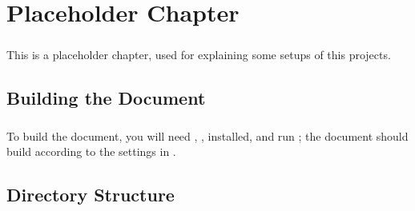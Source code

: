 \chapter{Placeholder Chapter}
\label{chap:placeholder}

\paragraph{}This is a placeholder chapter, used for explaining some setups of this projects.

\section{Building the Document}

\paragraph{}To build the document, you will need , ,  installed, and run ; the document should build according to the settings in .

\section{Directory Structure}
\label{sect:dir-struct}

